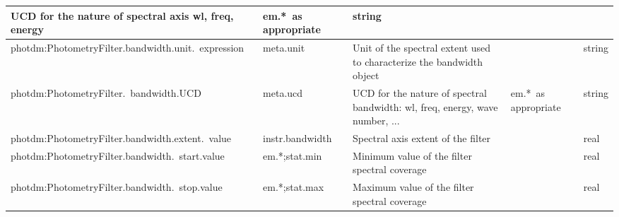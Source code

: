 \documentclass[11pt,a4paper]{ivoa}
\begin{document}
\begin{appendices}
\begin{table}[H]
\begin{adjustbox}{angle=90}
\begin{tabular}{p{2.5in}|p{1.5in}|p{2in}|p{0.74in}|p{0.35in}}
\multicolumn{1}{p{2in}}{{\fontsize{8pt}{8pt}\selectfont UCD for the nature of
spectral axis wl, freq, energy}} &
\multicolumn{1}{p{0.74in}}{{\fontsize{8pt}{8pt}\selectfont em.*\ as appropriate}} &
\multicolumn{1}{p{0.35in}}{{\fontsize{8pt}{8pt}\selectfont string}} \\
\hline
\multicolumn{1}{p{2.5in}}{{\fontsize{8pt}{8pt}
\selectfont photdm:PhotometryFilter.bandwidth.unit.\ expression}} &
\multicolumn{1}{p{1.5in}}{{\fontsize{8pt}{8pt}\selectfont meta.unit}} &
\multicolumn{1}{p{2in}}{{\fontsize{8pt}{8pt}\selectfont Unit of the spectral extent
used to characterize the bandwidth object}} &
\multicolumn{1}{p{0.74in}}{{\fontsize{8pt}{8pt}\selectfont }} &
\multicolumn{1}{p{0.35in}}{{\fontsize{8pt}{8pt}\selectfont string}} \\
\hline
\multicolumn{1}{p{2.5in}}{
{\fontsize{8pt}{8pt}\selectfont photdm:PhotometryFilter.\ bandwidth.UCD}} &
\multicolumn{1}{p{1.5in}}{{\fontsize{8pt}{8pt}\selectfont meta.ucd }} &
\multicolumn{1}{p{2in}}{{\fontsize{8pt}{8pt}\selectfont UCD for the nature of
spectral bandwidth: wl, freq, energy, wave number, ...}} &
\multicolumn{1}{p{0.74in}}{{\fontsize{8pt}{8pt}\selectfont em.*\ as appropriate}} &
\multicolumn{1}{p{0.35in}}{{\fontsize{8pt}{8pt}\selectfont string}} \\
\hline
\multicolumn{1}{p{2.5in}}{{\fontsize{8pt}{8pt}\selectfont photdm:PhotometryFilter.bandwidth.extent.\ value}} &
\multicolumn{1}{p{1.5in}}{{\fontsize{8pt}{8pt}\selectfont instr.bandwidth}} &
\multicolumn{1}{p{2in}}{{\fontsize{8pt}{8pt}\selectfont Spectral axis extent of the filter}} &
\multicolumn{1}{p{0.74in}}{} &
\multicolumn{1}{p{0.35in}}{{\fontsize{8pt}{8pt}\selectfont real}} \\
\hline
\multicolumn{1}{p{2.5in}}{{\fontsize{8pt}{8pt}
\selectfont photdm:PhotometryFilter.bandwidth.\ start.value}} &
\multicolumn{1}{p{1.5in}}{{\fontsize{8pt}{8pt}\selectfont em.*;stat.min}} &
\multicolumn{1}{p{2in}}{{\fontsize{8pt}{8pt}\selectfont Minimum value of the filter
spectral coverage}} &
\multicolumn{1}{p{0.74in}}{} &
\multicolumn{1}{p{0.35in}}{{\fontsize{8pt}{8pt}\selectfont real}} \\
\hline
\multicolumn{1}{p{2.5in}}{{\fontsize{8pt}{8pt}
\selectfont photdm:PhotometryFilter.bandwidth.\ stop.value}} &
\multicolumn{1}{p{1.5in}}{{\fontsize{8pt}{8pt}\selectfont em.*;stat.max}} &
\multicolumn{1}{p{2in}}{{\fontsize{8pt}{8pt}\selectfont Maximum value of the
filter spectral coverage}} &
\multicolumn{1}{p{0.74in}}{} &
\multicolumn{1}{p{0.35in}}{{\fontsize{8pt}{8pt}\selectfont real}} \\
\hline
\end{tabular}
\end{adjustbox}
 \end{table}



\end{appendices}
\end{document}

